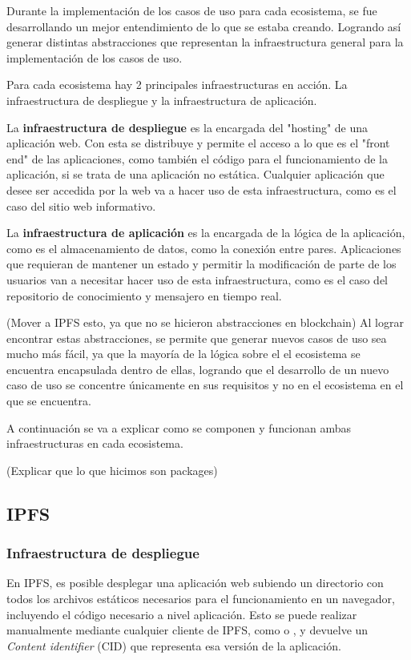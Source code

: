 Durante la implementación de los casos de uso para cada ecosistema, se fue desarrollando un mejor entendimiento de lo que se estaba creando. Logrando así generar distintas abstracciones que representan la infraestructura general para la implementación de los casos de uso.

Para cada ecosistema hay 2 principales infraestructuras en acción. La infraestructura de despliegue y la infraestructura de aplicación.

La \textbf{infraestructura de despliegue} es la encargada del "hosting" de una aplicación web. Con esta se distribuye y permite el acceso a lo que es el "front end" de las aplicaciones, como también el código para el funcionamiento de la aplicación, si se trata de una aplicación no estática. Cualquier aplicación que desee ser accedida por la web va a hacer uso de esta infraestructura, como es el caso del sitio web informativo.

La \textbf{infraestructura de aplicación} es la encargada de la lógica de la aplicación, como es el almacenamiento de datos, como la conexión entre pares. Aplicaciones que requieran de mantener un estado y permitir la modificación de parte de los usuarios van a necesitar hacer uso de esta infraestructura, como es el caso del repositorio de conocimiento y mensajero en tiempo real.

(Mover a IPFS esto, ya que no se hicieron abstracciones en blockchain) Al lograr encontrar estas abstracciones, se permite que generar nuevos casos de uso sea mucho más fácil, ya que la mayoría de la lógica sobre el el ecosistema se encuentra encapsulada dentro de ellas, logrando que el desarrollo de un nuevo caso de uso se concentre únicamente en sus requisitos y no en el ecosistema en el que se encuentra.

A continuación se va a explicar como se componen y funcionan ambas infraestructuras en cada ecosistema.

(Explicar que lo que hicimos son packages)

\subsection{IPFS}

\subsubsection{Infraestructura de despliegue}

En IPFS, es posible desplegar una aplicación web subiendo un directorio con todos los archivos estáticos necesarios para el funcionamiento en un navegador, incluyendo el código necesario a nivel aplicación. Esto se puede realizar manualmente mediante cualquier cliente de IPFS, como \cite{kubo} o \cite{helia}, y devuelve un \textit{Content identifier} (CID) \cite{cid} que representa esa versión de la aplicación.

